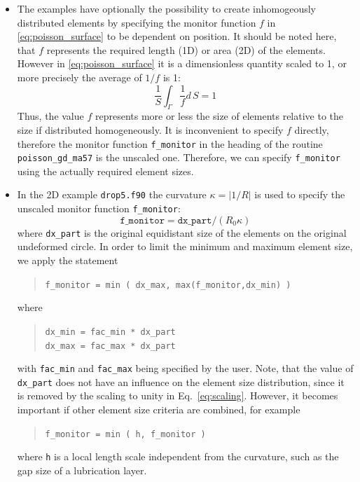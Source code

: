 \begin{itemize}
\item The examples have optionally the possibility to create inhomogeously distributed elements by 
specifying the monitor function $f$ in \eqref{eq:poisson_surface} to be dependent on position. 
It should be noted here, that $f$ represents the required length (1D) or area (2D) of the elements. However in
\eqref{eq:poisson_surface} it is a dimensionless quantity scaled to 1, or more precisely the average of $1/f$ is 1:
\begin{equation}
        \dfrac 1 S \int_\Gamma\dfrac 1 f d\,S=1\label{eq:scaling}
\end{equation}
Thus, the value $f$ represents more or less the size of elements relative to the size if distributed homogeneously. 
It is inconvenient to specify $f$ directly, therefore the monitor function \texttt{f\_monitor} in the heading of the routine \texttt{poisson\_gd\_ma57} is the unscaled one. Therefore, we can specify \texttt{f\_monitor} using the actually required element sizes.
\item In the 2D example \texttt{drop5.f90} the curvature $\kappa=|1/R|$ is used to specify the unscaled monitor function \texttt{f\_monitor}:
\[
    \texttt{f\_monitor}=  \texttt{dx\_part}/(R_0\kappa) 
\]
where \texttt{dx\_part} is the original equidistant size of the elements on the original undeformed circle. In order to limit the minimum and maximum element size, we apply the statement
\begin{quote}
    \texttt{f\_monitor = min ( dx\_max, max(f\_monitor,dx\_min) )}
\end{quote}
where
\begin{quote}
   \texttt{dx\_min = fac\_min * dx\_part}\\
   \texttt{dx\_max = fac\_max * dx\_part}
\end{quote}
with \texttt{fac\_min} and \texttt{fac\_max} being specified by the user. Note, that  the value of \texttt{dx\_part} does not have an influence on the element size distribution, since it is removed by the scaling to unity in Eq.~\eqref{eq:scaling}. However, it becomes important if other element size criteria are combined, for example
\begin{quote}
    \texttt{f\_monitor = min ( h, f\_monitor )}
\end{quote}
where \texttt{h} is a local length scale independent from the curvature, such as the gap size of a lubrication layer.


\end{itemize}
